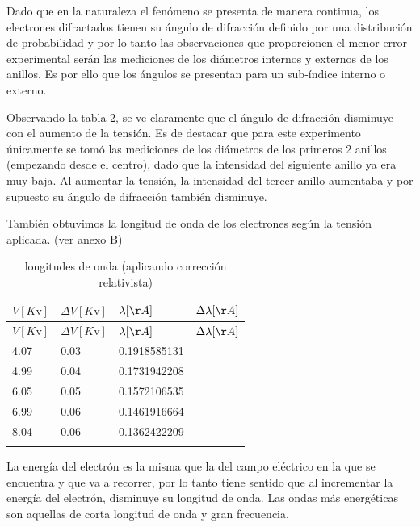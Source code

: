 \documentclass[]{article}
\begin{document}
Dado que en la naturaleza el fenómeno se presenta de manera continua,
los electrones difractados tienen su ángulo de difracción definido por
una distribución de probabilidad y por lo tanto las observaciones que
proporcionen el menor error experimental serán las mediciones de los
diámetros internos y externos de los anillos. Es por ello que los
ángulos se presentan para un sub-índice interno o externo.

Observando la tabla 2, se ve claramente que el ángulo de difracción
disminuye con el aumento de la tensión. Es de destacar que para este
experimento únicamente se tomó las mediciones de los diámetros de los
primeros 2 anillos (empezando desde el centro), dado que la intensidad
del siguiente anillo ya era muy baja. Al aumentar la tensión, la
intensidad del tercer anillo aumentaba y por supuesto su ángulo de
difracción también disminuye.

También obtuvimos la longitud de onda de los electrones según la tensión
aplicada. (ver anexo B)

\begin{longtable}[]{@{}llll@{}}
\toprule
\(V[K\mathrm{v}]\) & \(\Delta V [K\mathrm{v}]\) & \(\lambda [\AA]\) &
\(\Delta \lambda [\AA]\)\tabularnewline
\midrule
\endfirsthead
\toprule
\(V[K\mathrm{v}]\) & \(\Delta V [K\mathrm{v}]\) & \(\lambda [\AA]\) &
\(\Delta \lambda [\AA]\)\tabularnewline
\midrule
\endhead
4.07 & 0.03 & 0.1918585131 &\tabularnewline
4.99 & 0.04 & 0.1731942208 &\tabularnewline
6.05 & 0.05 & 0.1572106535 &\tabularnewline
6.99 & 0.06 & 0.1461916664 &\tabularnewline
8.04 & 0.06 & 0.1362422209 &\tabularnewline
\bottomrule
\caption{longitudes de onda (aplicando corrección
relativista)}\tabularnewline
\end{longtable}

La energía del electrón es la misma que la del campo eléctrico en la que
se encuentra y que va a recorrer, por lo tanto tiene sentido que al
incrementar la energía del electrón, disminuye su longitud de onda. Las
ondas más energéticas son aquellas de corta longitud de onda y gran
frecuencia.
\end{document}
